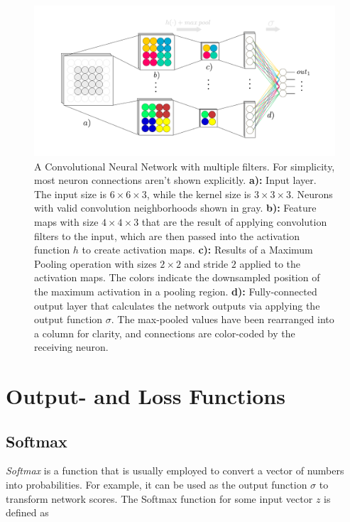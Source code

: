 \begin {figure}[!ht]
	\begin{center}
		\includegraphics[scale=0.75]{img/fig_convnet}
	\end{center}
	\caption{A Convolutional Neural Network with multiple filters. For simplicity, most neuron connections aren't shown explicitly. \textbf{a):} Input layer. The input size is $6 \times 6 \times 3$, while the kernel size is $3 \times 3 \times 3$. Neurons with valid convolution neighborhoods shown in gray. \textbf{b):} Feature maps with size $4 \times 4 \times 3$ that are the result of applying convolution filters to the input, which are then passed into the activation function $h$ to create activation maps. \textbf{c):} Results of a Maximum Pooling operation with sizes $2 \times 2$ and stride $2$ applied to the activation maps. The colors indicate the downsampled position of the maximum activation in a pooling region. \textbf{d):} Fully-connected output layer that calculates the network outputs via applying the output function $\sigma$. The max-pooled values have been rearranged into a column for clarity, and connections are color-coded by the receiving neuron.}
	\label{fig:convnet}
\end {figure}


	\section {Output- and Loss Functions}

	\subsection{Softmax}
\label{subsec:softmax}

\textit{Softmax} is a function that is usually employed to convert a vector of numbers into probabilities. For example, it can be used as the output function $\sigma$ to transform network scores. The Softmax function for some input vector $z$ is defined as

